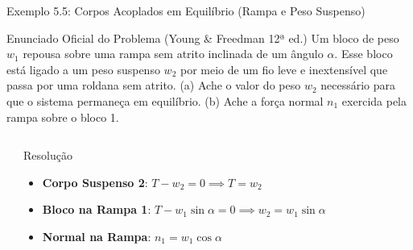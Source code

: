 \documentclass[10pt,aspectratio=169]{beamer}
\begin{document}
\begin{frame}{Exemplo 5.5: Corpos Acoplados em Equilíbrio (Rampa e Peso Suspenso)}
    \begin{block}{Enunciado Oficial do Problema (Young \& Freedman 12ª ed.)}
        \small
        Um bloco de peso $w_1$ repousa sobre uma rampa sem atrito inclinada de um ângulo $\alpha$. Esse bloco está ligado a um peso suspenso $w_2$ por meio de um fio leve e inextensível que passa por uma roldana sem atrito. (a) Ache o valor do peso $w_2$ necessário para que o sistema permaneça em equilíbrio. (b) Ache a força normal $n_1$ exercida pela rampa sobre o bloco 1.
    \end{block}
    \begin{columns}[T]
        \begin{center}
        \end{center}
        \begin{exampleblock}{Resolução}
            \small
            \begin{itemize}\setlength{\itemsep}{3pt}
                \item \textbf{Corpo Suspenso 2}: $T - w_2 = 0 \implies T = w_2$
                \item \textbf{Bloco na Rampa 1}: $T - w_1 \sin\alpha = 0 \implies w_2 = w_1 \sin\alpha$
                \item \textbf{Normal na Rampa}: $n_1 = w_1 \cos\alpha$
            \end{itemize}
        \end{exampleblock}
    \end{columns}
\end{frame}
\end{document}
